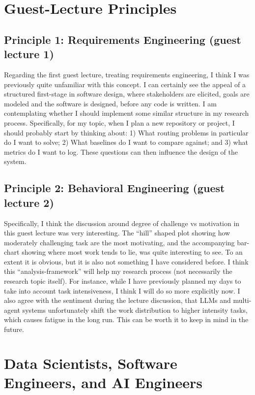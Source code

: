 \documentclass[11pt]{article}
\begin{document}
\section{Guest-Lecture Principles}

\subsection{Principle 1: Requirements Engineering (guest lecture 1)}
Regarding the first guest lecture, treating requirements engineering, I think I was previously quite unfamiliar with this concept. I can certainly see the appeal of a structured first-stage in software design, where stakeholders are elicited, goals are modeled and the software is designed, before any code is written. I am contemplating whether I should implement some similar structure in my research process. Specifically, for my topic, when I plan a new repository or project, I should probably start by thinking about: 1) What routing problems in particular do I want to solve; 2) What baselines do I want to compare against; and 3) what metrics do I want to log. These questions can then influence the design of the system.  

\subsection{Principle 2: Behavioral Engineering (guest lecture 2)}

Specifically, I think the discussion around degree of challenge vs motivation in this guest lecture was very interesting. The ``hill'' shaped plot showing how moderately challenging task are the most motivating, and the accompanying bar-chart showing where most work tends to lie, was quite interesting to see. To an extent it is obvious, but it is also not something I have considered before. I think this ``analysis-framework'' will help my research process (not necessarily the research topic itself). For instance, while I have previously planned my days to take into account task intensiveness, I think I will do so more explicitly now. I also agree with the sentiment during the lecture discussion, that LLMs and multi-agent systems unfortunately shift the work distribution to higher intensity tasks, which causes fatigue in the long run. This can be worth it to keep in mind in the future. 

\section{Data Scientists, Software Engineers, and AI Engineers}
\end{document}

